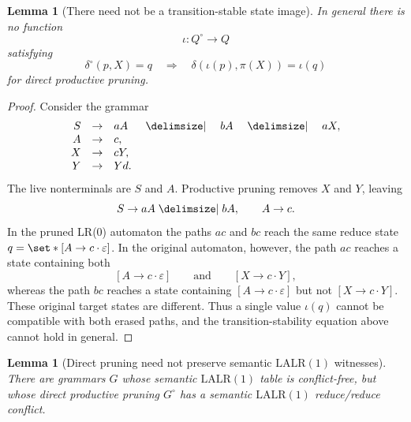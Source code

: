 \documentclass[11pt,a4paper]{article}
\theoremstyle{prettyplain}
\newtheorem{lemma}[theorem]{Lemma}
\theoremstyle{prettydef}
\def\mid{\;\delimsize\vert\;}#1%
\newcommand{\eps}{\varepsilon}
\newcommand{\LALRone}{\mathrm{LALR(1)}}
\newcommand{\Item}[2]{[#1\to #2]}
\begin{document}
\begin{lemma}[There need not be a transition-stable state image]
\label{lem:no-functional-image}
In general there is no function
\[
\iota:Q^\circ\to Q
\]
satisfying
\[
\delta^\circ(p,X)=q
\quad\Longrightarrow\quad
\delta(\iota(p),\pi(X))=\iota(q)
\]
for direct productive pruning.
\end{lemma}

\begin{proof}
Consider the grammar
\[
\begin{array}{rclcrcl}
S&\to&aA&\mid&bA&\mid&aX,\\
A&\to&c,\\
X&\to&cY,\\
Y&\to&Yd.
\end{array}
\]
The live nonterminals are \(S\) and \(A\).  Productive pruning removes \(X\) and
\(Y\), leaving
\[
S\to aA\mid bA,
\qquad
A\to c.
\]
In the pruned LR(0) automaton the paths \(ac\) and \(bc\) reach the same reduce
state \(q=\set*{\Item{A}{c\cdot\eps}}\).  In the original automaton, however,
the path \(ac\) reaches a state containing both
\[
\Item{A}{c\cdot\eps}
\qquad\text{and}\qquad
\Item{X}{c\cdot Y},
\]
whereas the path \(bc\) reaches a state containing \(\Item{A}{c\cdot\eps}\) but
not \(\Item{X}{c\cdot Y}\).  These original target states are different.  Thus a
single value \(\iota(q)\) cannot be compatible with both erased paths, and the
transition-stability equation above cannot hold in general.
\end{proof}

\begin{lemma}[Direct pruning need not preserve semantic \(\LALRone\) witnesses]
\label{lem:direct-pruning-counterexample}
There are grammars \(G\) whose semantic \(\LALRone\) table is conflict-free, but
whose direct productive pruning \(G^\circ\) has a semantic \(\LALRone\)
reduce/reduce conflict.
\end{lemma}
\end{document}
